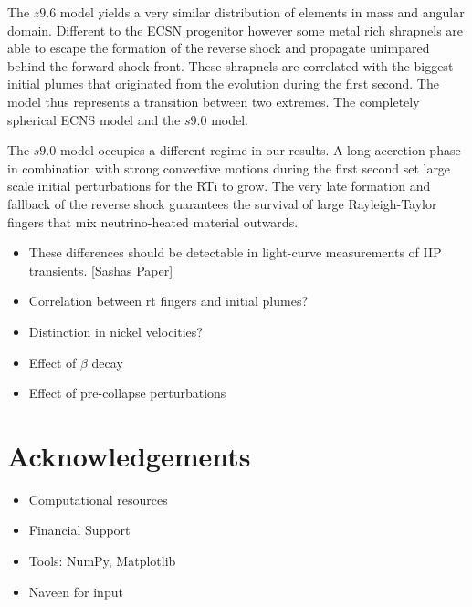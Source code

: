 \documentclass[fleqn,usenatbib]{mnras}
\newcommand{\COM}[1]{{\color{orange}#1}}
\begin{document}
The $z9.6$ model yields a very similar distribution of elements in mass and angular domain. Different to the ECSN progenitor however some metal rich shrapnels are able to escape the formation of the reverse shock and propagate unimpared behind the forward shock front. These shrapnels are correlated with the biggest initial plumes that originated from the evolution during the first second. The model thus represents a transition between two extremes. The completely spherical ECNS model and the $s9.0$ model.

The $s9.0$ model occupies a different regime in our results. A long accretion phase in combination with strong convective motions during the first second set large scale initial perturbations for the RTi to grow. The very late formation and fallback of the reverse shock guarantees the survival of large Rayleigh-Taylor fingers that mix neutrino-heated material outwards. 


\begin{itemize}
    \item \COM{These differences should be detectable in light-curve measurements of IIP transients. [Sashas Paper]}
    \item \COM{Correlation between rt fingers and initial plumes?}
    \item \COM{Distinction in nickel velocities?}
    \item \COM{Effect of $\beta$ decay}
    \item \COM{Effect of pre-collapse perturbations}
\end{itemize}

\section*{Acknowledgements}
\begin{itemize}
    \item Computational resources
    \item Financial Support
    \item Tools: NumPy, Matplotlib
    \item Naveen for input
\end{itemize}



\newpage
\appendix
\end{document}
